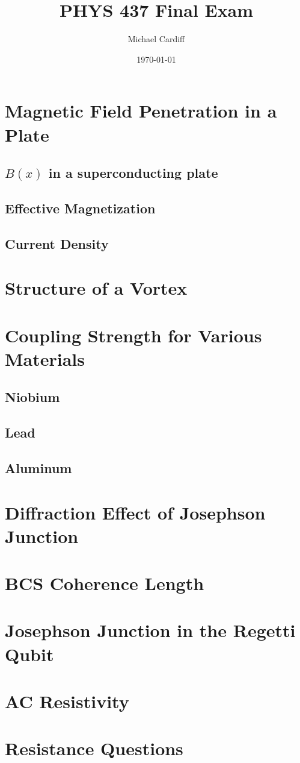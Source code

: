 \documentclass[12pt]{article}
\title{\vspace{-3em}PHYS 437 Final Exam}
\author{Michael Cardiff}
\date{\today}
\begin{document}
\maketitle

\section{Magnetic Field Penetration in a Plate}

\subsection{$B(x)$ in a superconducting plate}

\subsection{Effective Magnetization}

\subsection{Current Density}

\section{Structure of a Vortex}

\section{Coupling Strength for Various Materials}

\subsection{Niobium}

\subsection{Lead}

\subsection{Aluminum}

\section{Diffraction Effect of Josephson Junction}

\section{BCS Coherence Length}

\section{Josephson Junction in the Regetti Qubit}

\section{AC Resistivity}

\section{Resistance Questions}
\end{document}
